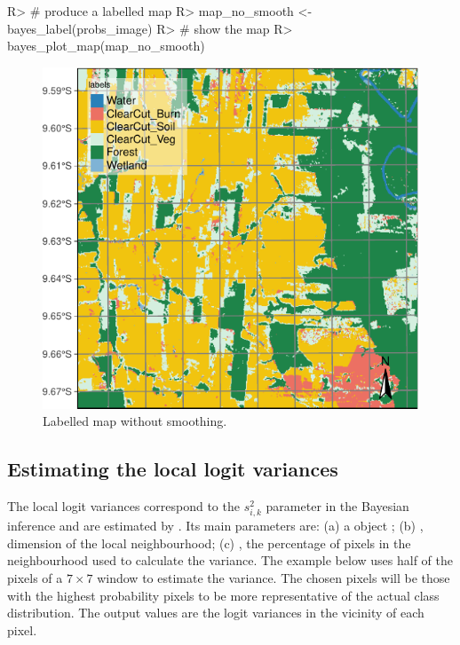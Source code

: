 \documentclass[
  shortnames]{jss}
\begin{document}
\begin{CodeChunk}
\begin{CodeInput}
R> # produce a labelled map
R> map_no_smooth <- bayes_label(probs_image)
R> # show the map
R> bayes_plot_map(map_no_smooth)
\end{CodeInput}
\begin{figure}[h]

{\centering \includegraphics{Bayesian_smoothing_JSS_files/figure-latex/map1-1} 

}

\caption[Labelled map without smoothing]{Labelled map without smoothing.}\label{fig:map1}
\end{figure}
\end{CodeChunk}

\newpage

\subsection{Estimating the local logit variances}\label{estimating-the-local-logit-variances}

The local logit variances correspond to the \(s^2_{i,k}\) parameter in the Bayesian inference and are estimated by . Its main parameters are: (a) a  object ; (b) , dimension of the local neighbourhood; (c) , the percentage of pixels in the neighbourhood used to calculate the variance. The example below uses half of the pixels of a \(7\times 7\) window to estimate the variance. The chosen pixels will be those with the highest probability pixels to be more representative of the actual class distribution. The output values are the logit variances in the vicinity of each pixel.
\end{document}
